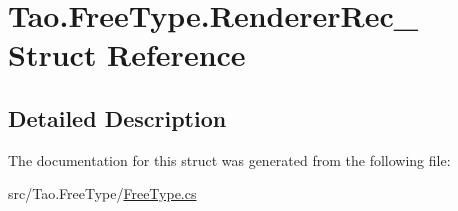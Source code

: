 \hypertarget{struct_tao_1_1_free_type_1_1_renderer_rec__}{
\section{Tao.FreeType.RendererRec\_\- Struct Reference}
\label{struct_tao_1_1_free_type_1_1_renderer_rec__}
}


\subsection{Detailed Description}


The documentation for this struct was generated from the following file:\begin{DoxyCompactItemize}
\item 
src/Tao.FreeType/\hyperlink{_free_type_8cs}{FreeType.cs}\end{DoxyCompactItemize}
